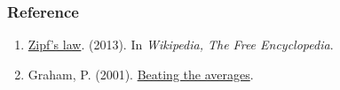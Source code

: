 \subsubsection{Reference}

\begin{enumerate}
\item
  \href{http://en.wikipedia.org/w/index.php?title=Zipf\%27s\_law\&oldid=575709945}{Zipf's
  law}. (2013). In \emph{Wikipedia, The Free Encyclopedia}.
\item
  Graham, P. (2001). \href{http://www.paulgraham.com/avg.html}{Beating
  the averages}.
\end{enumerate}
